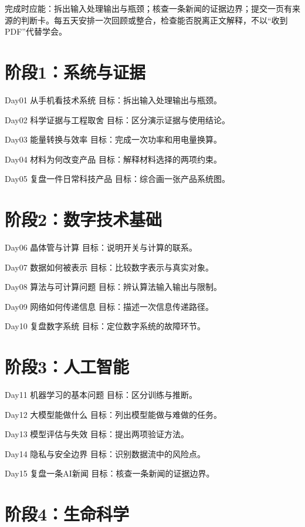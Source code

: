 \documentclass[11pt]{article}
\newcommand{\Needspace}[1]{\par\ifdim\dimexpr\pagegoal-\pagetotal\relax<#1\relax\newpage\fi}
\begin{document}
完成时应能：拆出输入处理输出与瓶颈；核查一条新闻的证据边界；提交一页有来源的判断卡。每五天安排一次回顾或整合，检查能否脱离正文解释，不以“收到PDF”代替学会。

\Needspace{5\baselineskip}\section*{阶段1：系统与证据}

Day01  从手机看技术系统
目标：拆出输入处理输出与瓶颈。

Day02  科学证据与工程取舍
目标：区分演示证据与使用结论。

Day03  能量转换与效率
目标：完成一次功率和用电量换算。

Day04  材料为何改变产品
目标：解释材料选择的两项约束。

Day05  复盘一件日常科技产品
目标：综合画一张产品系统图。

\Needspace{5\baselineskip}\section*{阶段2：数字技术基础}

Day06  晶体管与计算
目标：说明开关与计算的联系。

Day07  数据如何被表示
目标：比较数字表示与真实对象。

Day08  算法与可计算问题
目标：辨认算法输入输出与限制。

Day09  网络如何传递信息
目标：描述一次信息传递路径。

Day10  复盘数字系统
目标：定位数字系统的故障环节。

\Needspace{5\baselineskip}\section*{阶段3：人工智能}

Day11  机器学习的基本问题
目标：区分训练与推断。

Day12  大模型能做什么
目标：列出模型能做与难做的任务。

Day13  模型评估与失效
目标：提出两项验证方法。

Day14  隐私与安全边界
目标：识别数据流中的风险点。

Day15  复盘一条AI新闻
目标：核查一条新闻的证据边界。

\Needspace{5\baselineskip}\section*{阶段4：生命科学}
\end{document}
